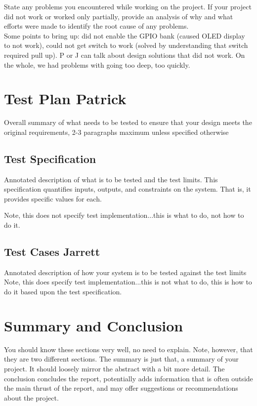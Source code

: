 \documentclass[12pt]{article} %
\begin{document}
State any problems you encountered while working on the project. If your project did not work or worked only partially, provide an analysis of why and what efforts were made to identify the root cause of any problems. \\

Some points to bring up: did not enable the GPIO bank (caused OLED display to not work), could not get switch to work (solved by understanding that switch required pull up). P or J can talk about design solutions that did not work. On the whole, we had problems with going too deep, too quickly.

\section{Test Plan Patrick}

Overall summary of what needs to be tested to ensure that your design meets the original requirements, 2-3 paragraphs maximum unless specified otherwise

\subsection{Test Specification}

Annotated description of what is to be tested and the test limits.  This specification quantifies inputs, outputs, and constraints on the system.  That is, it provides specific values for each. 

Note, this does not specify test implementation...this is what to do, not how to do it.

\subsection{Test Cases  Jarrett}

Annotated description of how your system is to be tested against the test limits
Note, this does specify test implementation...this is not what to do, this is how to do it based upon the test specification.

\section{Summary and Conclusion}

You should know these sections very well, no need to explain.  Note, however, that they are two different sections.  The summary is just that, a summary of your project.  It should loosely mirror the abstract with a bit more detail.  The conclusion concludes the report, potentially adds information that is often outside the main thrust of the report, and may offer suggestions or recommendations about the project.
\end{document}
